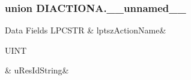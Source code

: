 \subsubsection{union D\-I\-A\-C\-T\-I\-O\-N\-A.\-\_\-\-\_\-unnamed\-\_\-\-\_\-}
\begin{DoxyFields}{Data Fields}
\hypertarget{a00003_a306924baa797b5e48dc1e53cd5fa6e58}{L\-P\-C\-S\-T\-R}\label{a00003_a306924baa797b5e48dc1e53cd5fa6e58}
&
lptsz\-Action\-Name&
\\
\hline

\hypertarget{a00003_a218c793f10200f6283aa0d41c3626ffc}{U\-I\-N\-T}\label{a00003_a218c793f10200f6283aa0d41c3626ffc}
&
u\-Res\-Id\-String&
\\
\hline

\end{DoxyFields}
\label{d4/d6d/a00055}
\hypertarget{a00003_d4/d6d/a00055}{}
